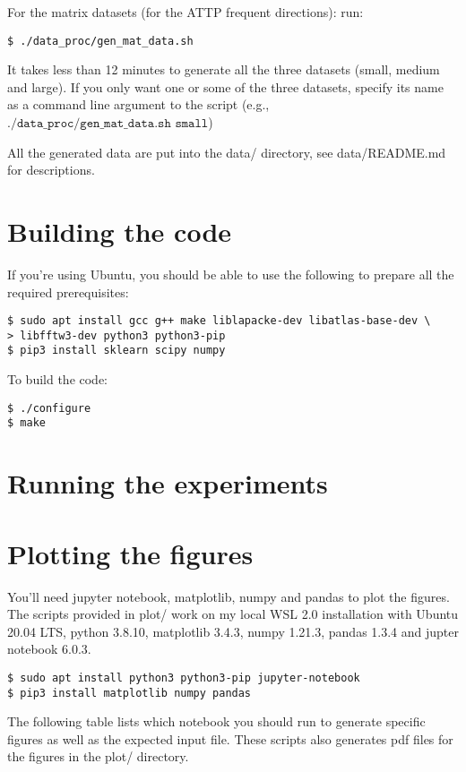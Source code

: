 \documentclass[11pt]{article}
\begin{document}
For the matrix datasets (for the ATTP frequent directions): run:
\begin{verbatim}
$ ./data_proc/gen_mat_data.sh
\end{verbatim}
It takes less than 12 minutes to generate all the three datasets (small,
medium and large). If you only want one or some of the three datasets,
specify its name as a command line argument to the script (e.g.,
$\texttt{./data\_proc/gen\_mat\_data.sh small}$)

All the generated data are put into the data/ directory, see
data/README.md for descriptions.

\section{Building the code}
If you're using Ubuntu, you should be able to use the following to
prepare all the required prerequisites:
\begin{verbatim}
$ sudo apt install gcc g++ make liblapacke-dev libatlas-base-dev \
> libfftw3-dev python3 python3-pip
$ pip3 install sklearn scipy numpy
\end{verbatim}

To build the code:
\begin{verbatim}
$ ./configure
$ make
\end{verbatim}

\section{Running the experiments}

\section{Plotting the figures}

You'll need jupyter notebook, matplotlib, numpy and pandas to plot the
figures. The scripts provided in plot/ work on my local WSL 2.0
installation with Ubuntu 20.04 LTS, python 3.8.10, matplotlib 3.4.3,
numpy 1.21.3, pandas 1.3.4 and jupter notebook 6.0.3.
\begin{verbatim}
$ sudo apt install python3 python3-pip jupyter-notebook
$ pip3 install matplotlib numpy pandas
\end{verbatim}

The following table lists which notebook you should run to generate
specific figures as well as the expected input file. These scripts
also generates pdf files for the figures in the plot/ directory.
\end{document}
